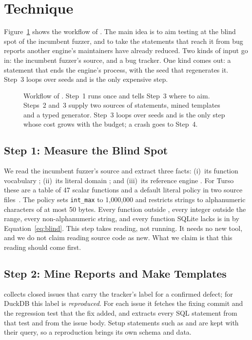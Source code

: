 \section{Technique}
\label{sec:technique}

Figure~\ref{fig:overview} shows the workflow of \tool. The main idea is to aim
testing at the blind spot of the incumbent fuzzer, and to take the statements
that reach it from bug reports another engine's maintainers have already
reduced. Two kinds of input go in: the incumbent fuzzer's source, and a bug
tracker. One kind comes out: a statement that ends the engine's process, with the
seed that regenerates it. Step~3 loops over seeds and is the only expensive step.

\begin{figure}[t]
  \centering
  
  \caption{Workflow of \tool. Step~1 runs once and tells Step~3 where to aim.
  Steps~2 and~3 supply two sources of statements, mined templates and a typed
  generator. Step~3 loops over seeds and is the only step whose cost grows with
  the budget; a crash goes to Step~4.}
  \label{fig:overview}
\end{figure}

\subsection{Step 1: Measure the Blind Spot}
\label{sec:step-blind}
We read the incumbent fuzzer's source and extract three facts: (i)~its function
vocabulary \Voc; (ii)~its literal domain \Lit; and (iii)~its reference engine
\Rengine. For Turso these are a table of 47 scalar functions and a default literal
policy in two source files~\cite{tursofuzzer}. The policy sets
\texttt{int\_max} to 1{,}000{,}000 and restricts strings to alphanumeric
characters of at most 50 bytes. Every function outside \Voc, every integer outside
the range, every non-alphanumeric string, and every function SQLite lacks is in
\Blind by Equation~\eqref{eq:blind}. This step takes reading, not running. It
needs no new tool, and we do not claim reading source code as new. What we
claim is that this reading should come first.

\subsection{Step 2: Mine Reports and Make Templates}
\label{sec:step-mine}
\tool collects closed issues that carry the tracker's label for a confirmed
defect; for DuckDB this label is \emph{reproduced}. For each issue it fetches the
fixing commit and the regression test that the fix added, and extracts every SQL
statement from that test and from the issue body. Setup statements such as
 and  are kept with their query, so a reproduction
brings its own schema and data.

